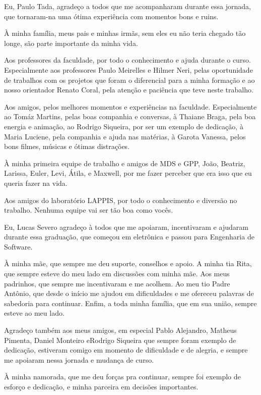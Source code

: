 \begin{agradecimentos}
Eu, Paulo Tada, agradeço a todos que me acompanharam durante essa jornada,
que tornaram-na uma ótima experiência com momentos bons e ruins.

À minha família, meus pais e minhas irmãs, sem eles eu não teria chegado tão
longe, são parte importante da minha vida.

Aos professores da faculdade, por todo o conhecimento e ajuda durante o curso. Especialmente
aos professores Paulo Meirelles e Hilmer Neri, pelas oportunidade de trabalhos com os
projetos que foram o diferencial para a minha formação e ao nosso orientador Renato Coral,
pela atenção e paciência que teve neste trabalho.

Aos amigos, pelos melhores momentos e experiências na faculdade. Especialmente
ao Tomáz Martins, pelas boas companhia e conversas, à Thaiane Braga, pela boa energia
e animação, ao Rodrigo Siqueira, por ser um exemplo de dedicação, à
Maria Luciene, pela companhia e ajuda nas matérias, à Garota Vanessa, pelos bons filmes,
músicas e ótimas distrações.

À minha primeira equipe de trabalho e amigos de MDS e GPP, João, Beatriz, Larissa, Euler,
Levi, Átila, e Maxwell, por me fazer perceber que era isso que eu queria fazer na vida.

Aos amigos do laboratório LAPPIS, por todo o conhecimento e diversão no trabalho.
Nenhuma equipe vai ser tão boa como vocês.

Eu, Lucas Severo agradeço à todos que me apoiaram, incentivaram e ajudaram
durante essa graduação, que começou em eletrônica e passou para Engenharia de 
Software.

À minha mãe, que sempre me deu suporte, conselhos e apoio. A minha tia Rita, que
sempre esteve do meu lado em discussões com minha mãe. Aos meus padrinhos, que
sempre me incentivaram e me acolhem. Ao meu tio Padre Antônio, que desde o início
me ajudou em dificuldades e me ofereceu palavras de sabedoria para continuar.
Enfim, a toda minha família, que em sua união, sempre esteve ao meu lado.

Agradeço também aos meus amigos, em especial Pablo Alejandro, Matheus Pimenta, 
Daniel Monteiro eRodrigo Siqueira que sempre foram exemplo de dedicação, estiveram comigo em
momento de dificuldade e de alegria, e sempre me apoiaram nessa jornada e mudança
de curso.

À minha namorada, que me deu forças pra continuar, sempre foi exemplo de esforço
e dedicação, e minha parceira em decisões importantes.


\end{agradecimentos}
